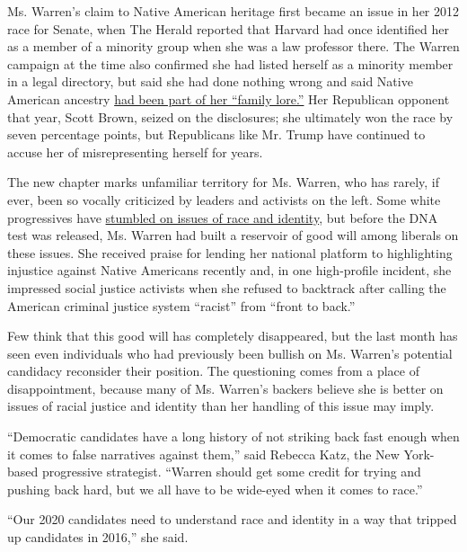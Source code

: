 Ms. Warren's claim to Native American heritage first became an issue in
her 2012 race for Senate, when The Herald reported that Harvard had once
identified her as a member of a minority group when she was a law
professor there. The Warren campaign at the time also confirmed she had
listed herself as a minority member in a legal directory, but said she
had done nothing wrong and said Native American ancestry
\href{https://www.nytimes3xbfgragh.onion/2012/05/01/us/politics/elizabeth-warrens-ancestry-irrelevant-in-hiring-law-schools-say.html}{had
been part of her ``family lore.''} Her Republican opponent that year,
Scott Brown, seized on the disclosures; she ultimately won the race by
seven percentage points, but Republicans like Mr. Trump have continued
to accuse her of misrepresenting herself for years.

The new chapter marks unfamiliar territory for Ms. Warren, who has
rarely, if ever, been so vocally criticized by leaders and activists on
the left. Some white progressives have
\href{https://www.nytimes3xbfgragh.onion/2015/07/19/us/protesters-confront-candidates-on-race-at-netroots-nation-conference.html}{stumbled
on issues of race and identity}, but before the DNA test was released,
Ms. Warren had built a reservoir of good will among liberals on these
issues. She received praise for lending her national platform to
highlighting injustice against Native Americans recently and, in one
high-profile incident, she impressed social justice activists when she
refused to backtrack after calling the American criminal justice system
``racist'' from ``front to back.''

Few think that this good will has completely disappeared, but the last
month has seen even individuals who had previously been bullish on Ms.
Warren's potential candidacy reconsider their position. The questioning
comes from a place of disappointment, because many of Ms. Warren's
backers believe she is better on issues of racial justice and identity
than her handling of this issue may imply.

``Democratic candidates have a long history of not striking back fast
enough when it comes to false narratives against them,'' said Rebecca
Katz, the New York-based progressive strategist. ``Warren should get
some credit for trying and pushing back hard, but we all have to be
wide-eyed when it comes to race.''

``Our 2020 candidates need to understand race and identity in a way that
tripped up candidates in 2016,'' she said.

